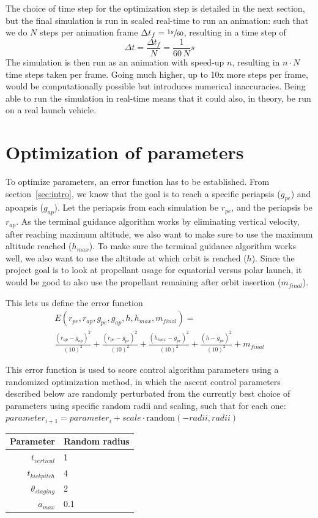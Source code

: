 \documentclass[11pt]{article}
\begin{document}
The choice of time step for the optimization step is detailed in the next section, but the final simulation is run in scaled real-time to run an animation: such that we do $N$ steps per animation frame $\Delta t_f = \sfrac{1s}{60}$, resulting
in a time step of 
$$
\Delta t = \frac{\Delta  t_f}{N} = \frac{1}{60\,N} s
$$ 
The simulation is then run as an animation with speed-up $n$, resulting in $n \cdot N$ time steps taken per frame. 
Going much higher, up to 10x more steps per frame, would be computationally possible but introduces
numerical inaccuracies. Being able to run the simulation in real-time means that it could also, in theory, be run on a real launch vehicle.

\section{Optimization of parameters} \label{sec:optimize}
To optimize parameters, an error function has to be established.
From section~\ref{sec:intro}, we know that the goal is to reach a specific periapsis ($g_{pe}$) and apoapsis ($g_{ap}$). 
Let the periapsis from each simulation be $r_{pe}$, and the periapsis be $r_{ap}$.
As the terminal guidance algorithm works by eliminating vertical velocity, after reaching maximum altitude, we also want to make sure to use the maximum altitude reached ($h_{max}$).
To make sure the terminal guidance algorithm works well, we also want to use the altitude at which orbit is reached ($h$).
Since the project goal is to look at propellant usage for equatorial versus polar launch, it would be good to also use the propellant remaining after orbit insertion ($m_{final}$).

This lets us define the error function
$$
\begin{aligned}
E(r_{pe}, r_{ap}, g_{pe}, g_{ap}, h, h_{max}, m_{final}) = \\
\frac{{\left( r_{ap} - g_{ap} \right)}^2}{{\left( 10 \right)}^2} +
\frac{{\left( r_{pe} - g_{pe} \right)}^2}{{\left( 10 \right)}^2} +
\frac{{\left( h_{max} - g_{pe} \right)}^2}{{\left( 10 \right)}^2} +
\frac{{\left( h - g_{pe} \right)}^2}{{\left( 10 \right)}^2}
+ m_{final}
\end{aligned}
$$

This error function is used to score control algorithm parameters using a randomized optimization method, in which the ascent control parameters described below 
are randomly perturbated from the currently best choice of parameters using specific random radii and scaling, such that for each one: $parameter_{i+1} = parameter_{i} + scale \cdot \text{random}(-radii, radii)$
\begin{center}
  \begin{tabular}{ r | l  }
    Parameter & Random radius \\
    \hline
    $t_{vertical}$ & 1 \\
    $t_{kickpitch}$ & 4 \\
    $\theta_{staging}$ & 2 \\
    $a_{max}$ & 0.1 \\
  \end{tabular}
\end{center}
\end{document}
